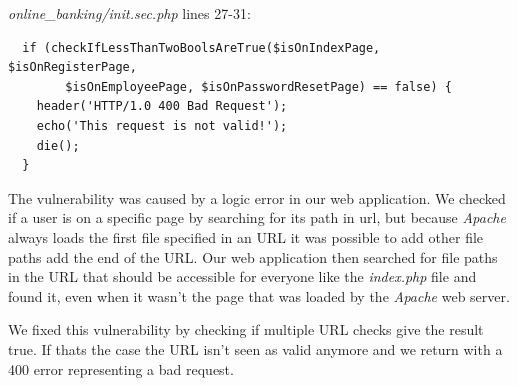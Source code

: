\documentclass[headsepline,footsepline,footinclude=false,oneside,fontsize=11pt,paper=a4,listof=totoc,bibliography=totoc]{scrbook} %
\begin{document}
\textit{online\_banking/init.sec.php} lines 27-31:
\begin{lstlisting} 
  if (checkIfLessThanTwoBoolsAreTrue($isOnIndexPage, $isOnRegisterPage, 
  		$isOnEmployeePage, $isOnPasswordResetPage) == false) {
    header('HTTP/1.0 400 Bad Request');
    echo('This request is not valid!');
    die();
  }
\end{lstlisting} 

The vulnerability was caused by a logic error in our web application. We checked if a user is on a specific page by searching for its path in url, but because \textit{Apache} always loads the first file specified in an URL it was possible to add other file paths add the end of the URL. Our web application then searched for file paths in the URL that should be accessible for everyone like the \textit{index.php} file and found it, even when it wasn't the page that was loaded by the \textit{Apache} web server.

We fixed this vulnerability by checking if multiple URL checks give the result true. If thats the case the URL isn't seen as valid anymore and we return with a 400 error representing a bad request.
\end{document}
